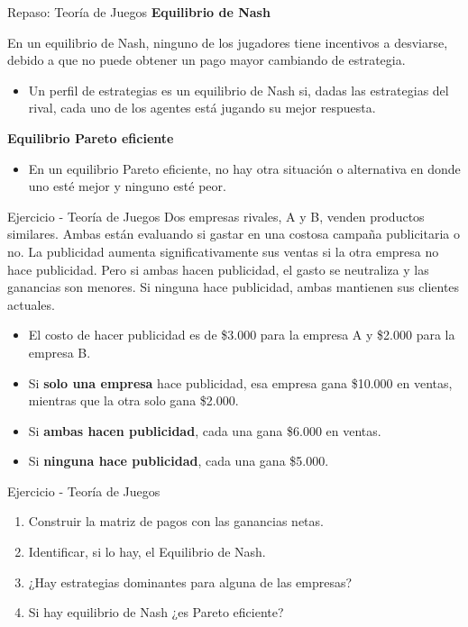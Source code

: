 \documentclass{beamer}
\begin{document}
\begin{frame}{Repaso: Teoría de Juegos}
\textbf{Equilibrio de Nash}
    \begin{boxB}
        \centering
        En un equilibrio de Nash, ninguno de los jugadores tiene incentivos a desviarse, debido a que no puede obtener un pago mayor cambiando de estrategia.
    \end{boxB}
    \begin{itemize}
        \item  Un perfil de estrategias es un equilibrio de Nash si, dadas las estrategias del rival, cada uno de los agentes está jugando su mejor respuesta.
    \end{itemize}
    \textbf{Equilibrio Pareto eficiente}
        \begin{itemize}
        \item   En un equilibrio Pareto eficiente, no hay otra situación o alternativa en donde uno esté mejor y ninguno esté peor. 
    \end{itemize}
\end{frame}

\begin{frame}{Ejercicio - Teoría de Juegos}
Dos empresas rivales, A y B, venden productos similares. Ambas están evaluando si gastar en una costosa campaña publicitaria o no. La publicidad aumenta significativamente sus ventas si la otra empresa no hace publicidad. Pero si ambas hacen publicidad, el gasto se neutraliza y las ganancias son menores. Si ninguna hace publicidad, ambas mantienen sus clientes actuales.
    \begin{itemize}
        \item El costo de hacer publicidad es de \$3.000 para la empresa A y \$2.000 para la empresa B.
        \item Si \textbf{solo una empresa} hace publicidad, esa empresa gana \$10.000 en ventas, mientras que la otra solo gana \$2.000.
        \item Si \textbf{ambas hacen publicidad}, cada una gana \$6.000 en ventas.
        \item Si \textbf{ninguna hace publicidad}, cada una gana \$5.000.
    \end{itemize}
\end{frame}

\begin{frame}{Ejercicio - Teoría de Juegos}
\begin{enumerate}
    \item Construir la matriz de pagos con las ganancias netas.
    \item Identificar, si lo hay, el Equilibrio de Nash.
    \item ¿Hay estrategias dominantes para alguna de las empresas?
    \item Si hay equilibrio de Nash ¿es Pareto eficiente?
\end{enumerate}
\end{frame}
\end{document}
